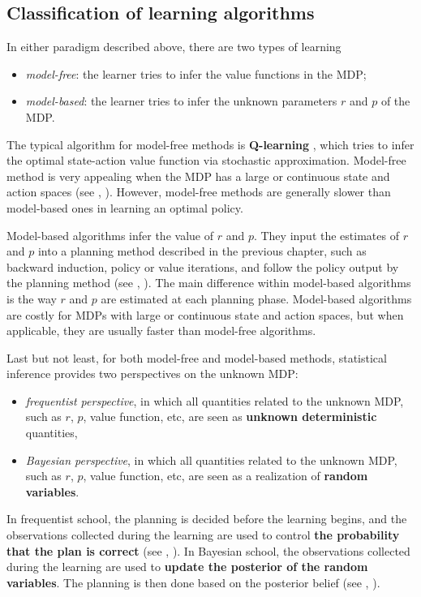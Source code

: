 \subsection{Classification of learning algorithms}
\label{ch:rl:ssec:class_algo}

In either paradigm described above, there are two types of learning
\begin{itemize}
    \item \emph{model-free}: the learner tries to infer the value functions in the MDP;
    \item \emph{model-based}: the learner tries to infer the unknown parameters $r$ and $p$ of the MDP.
\end{itemize}
The typical algorithm for model-free methods is \textbf{Q-learning} \cite{watkins1989learning}, which tries to infer the optimal state-action value function via stochastic approximation. 
Model-free method is very appealing when the MDP has a large or continuous state and action spaces (see \eg, \cite{mnih2015human, bellemare2017distributional, dabney2018distributional}).
However, model-free methods are generally slower than model-based ones in learning an optimal policy.

Model-based algorithms infer the value of $r$ and $p$. They input the estimates of $r$ and $p$ into a planning method described in the previous chapter, such as backward induction, policy or value iterations, and follow the policy output by the planning method (see \eg, \cite{jaksch2010near, osband2013more, azar2017minimax}).
The main difference within model-based algorithms is the way $r$ and $p$ are estimated at each planning phase.
Model-based algorithms are costly for MDPs with large or continuous state and action spaces, but when applicable, they are usually faster than model-free algorithms.

Last but not least, for both model-free and model-based methods, statistical inference provides two perspectives on the unknown MDP:
\begin{itemize}
    \item \emph{frequentist perspective}, in which all quantities related to the unknown MDP, such as $r$, $p$, value function, etc, are seen as \textbf{unknown deterministic} quantities,
    \item \emph{Bayesian perspective}, in which all quantities related to the unknown MDP, such as $r$, $p$, value function, etc, are seen as a realization of \textbf{random variables}.
\end{itemize}
In frequentist school, the planning is decided before the learning begins, and the observations collected during the learning are used to control \textbf{the probability that the plan is correct} (see \eg, \cite{jaksch2010near, azar2017minimax, jin2018q, shi2022pessimistic}).
In Bayesian school, the observations collected during the learning are used to \textbf{update the posterior of the random variables}.
The planning is then done based on the posterior belief (see \eg, \cite{osband2013more, ouyang2017learning, bellemare2017distributional, dabney2018distributional}).


